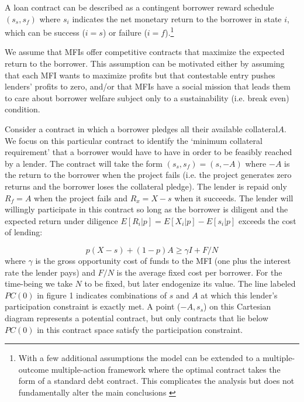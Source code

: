 \documentclass[letterpaper, 12pt]{article}
\begin{document}
A loan contract can be described as a contingent borrower reward
schedule \((s_{s},s_{f})\) where \(s_{i}\) indicates the net monetary
return to the borrower in state \(i\), which can be success (\(i = s\))
or failure (\(i = f\)).\footnote{With a few additional assumptions the
  model can be extended to a multiple-outcome multiple-action framework
  where the optimal contract takes the form of a standard debt contract.
  This complicates the analysis but does not fundamentally alter the
  main conclusions \citep{innes1990,conning2006}} 
  
  We assume that MFIs
offer competitive contracts that maximize the expected return to the
borrower. This assumption can be motivated either by assuming that each
MFI wants to maximize profits but that contestable entry pushes lenders'
profits to zero, and/or that MFIs have a social mission that leads them
to care about borrower welfare subject only to a sustainability (i.e.
break even) condition.

Consider a contract in which a borrower pledges all their available
collateral\(A\). We focus on this particular contract to identify the
`minimum collateral requirement' that a borrower would have to have in
order to be feasibly reached by a lender. The contract will take the
form \((s_{s},s_{f}) =(s, - A)\) where \(- A\) is the return to the
borrower when the project fails (i.e. the project generates zero returns and the borrower loses the collateral pledge). The lender is repaid only \(R_{f} = A\) when the project fails and \(R_x = X - s\) when it
succeeds. The lender will willingly participate in this contract so long
as the borrower is diligent and the expected return under diligence
\(E[R_{i}|p] = E[ X_{i}|p] - E[ s_{i}|p]\)
exceeds the cost of lending:


\begin{equation} \label{PC}
    p(X - s) + (1 - p)A \geq \gamma I + F/N
\end{equation}
where \(\gamma\) is the gross opportunity cost of funds to the MFI (one
plus the interest rate the lender pays) and \(F/N\) is the average fixed cost per borrower. For the time-being we take $N$ to be fixed, but later endogenize its value. The line labeled \(PC(0)\) in figure 1 indicates combinations of \(s\) and \(A\) at which this lender's participation constraint is exactly met. A point (\(- A,s_s\)) on this Cartesian diagram represents a potential contract, but only contracts that lie below \(PC(0)\) in this contract space satisfy the
participation constraint.
\end{document}
